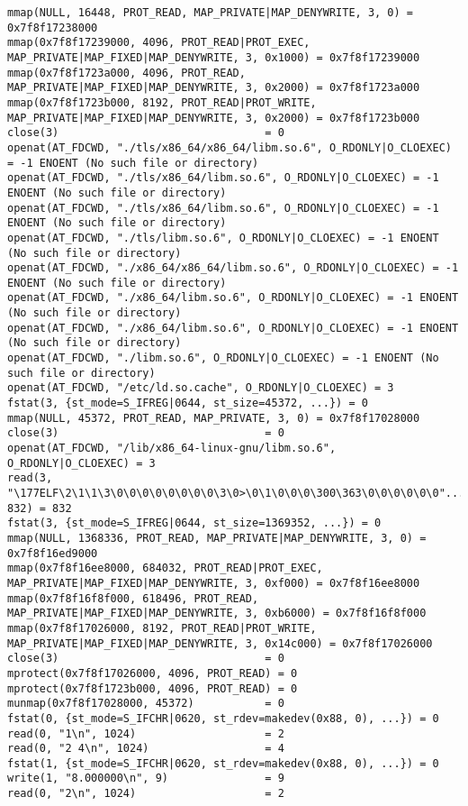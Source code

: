 \documentclass[pdf, unicode, 12pt, a4paper,oneside,fleqn]{article}
\begin{document}
{\begin{verbatim}
mmap(NULL, 16448, PROT_READ, MAP_PRIVATE|MAP_DENYWRITE, 3, 0) = 0x7f8f17238000
mmap(0x7f8f17239000, 4096, PROT_READ|PROT_EXEC, MAP_PRIVATE|MAP_FIXED|MAP_DENYWRITE, 3, 0x1000) = 0x7f8f17239000
mmap(0x7f8f1723a000, 4096, PROT_READ, MAP_PRIVATE|MAP_FIXED|MAP_DENYWRITE, 3, 0x2000) = 0x7f8f1723a000
mmap(0x7f8f1723b000, 8192, PROT_READ|PROT_WRITE, MAP_PRIVATE|MAP_FIXED|MAP_DENYWRITE, 3, 0x2000) = 0x7f8f1723b000
close(3)                                = 0
openat(AT_FDCWD, "./tls/x86_64/x86_64/libm.so.6", O_RDONLY|O_CLOEXEC) = -1 ENOENT (No such file or directory)
openat(AT_FDCWD, "./tls/x86_64/libm.so.6", O_RDONLY|O_CLOEXEC) = -1 ENOENT (No such file or directory)
openat(AT_FDCWD, "./tls/x86_64/libm.so.6", O_RDONLY|O_CLOEXEC) = -1 ENOENT (No such file or directory)
openat(AT_FDCWD, "./tls/libm.so.6", O_RDONLY|O_CLOEXEC) = -1 ENOENT (No such file or directory)
openat(AT_FDCWD, "./x86_64/x86_64/libm.so.6", O_RDONLY|O_CLOEXEC) = -1 ENOENT (No such file or directory)
openat(AT_FDCWD, "./x86_64/libm.so.6", O_RDONLY|O_CLOEXEC) = -1 ENOENT (No such file or directory)
openat(AT_FDCWD, "./x86_64/libm.so.6", O_RDONLY|O_CLOEXEC) = -1 ENOENT (No such file or directory)
openat(AT_FDCWD, "./libm.so.6", O_RDONLY|O_CLOEXEC) = -1 ENOENT (No such file or directory)
openat(AT_FDCWD, "/etc/ld.so.cache", O_RDONLY|O_CLOEXEC) = 3
fstat(3, {st_mode=S_IFREG|0644, st_size=45372, ...}) = 0
mmap(NULL, 45372, PROT_READ, MAP_PRIVATE, 3, 0) = 0x7f8f17028000
close(3)                                = 0
openat(AT_FDCWD, "/lib/x86_64-linux-gnu/libm.so.6", O_RDONLY|O_CLOEXEC) = 3
read(3, "\177ELF\2\1\1\3\0\0\0\0\0\0\0\0\3\0>\0\1\0\0\0\300\363\0\0\0\0\0\0"..., 832) = 832
fstat(3, {st_mode=S_IFREG|0644, st_size=1369352, ...}) = 0
mmap(NULL, 1368336, PROT_READ, MAP_PRIVATE|MAP_DENYWRITE, 3, 0) = 0x7f8f16ed9000
mmap(0x7f8f16ee8000, 684032, PROT_READ|PROT_EXEC, MAP_PRIVATE|MAP_FIXED|MAP_DENYWRITE, 3, 0xf000) = 0x7f8f16ee8000
mmap(0x7f8f16f8f000, 618496, PROT_READ, MAP_PRIVATE|MAP_FIXED|MAP_DENYWRITE, 3, 0xb6000) = 0x7f8f16f8f000
mmap(0x7f8f17026000, 8192, PROT_READ|PROT_WRITE, MAP_PRIVATE|MAP_FIXED|MAP_DENYWRITE, 3, 0x14c000) = 0x7f8f17026000
close(3)                                = 0
mprotect(0x7f8f17026000, 4096, PROT_READ) = 0
mprotect(0x7f8f1723b000, 4096, PROT_READ) = 0
munmap(0x7f8f17028000, 45372)           = 0
fstat(0, {st_mode=S_IFCHR|0620, st_rdev=makedev(0x88, 0), ...}) = 0
read(0, "1\n", 1024)                    = 2
read(0, "2 4\n", 1024)                  = 4
fstat(1, {st_mode=S_IFCHR|0620, st_rdev=makedev(0x88, 0), ...}) = 0
write(1, "8.000000\n", 9)               = 9
read(0, "2\n", 1024)                    = 2

\end{verbatim}}
\end{document}
